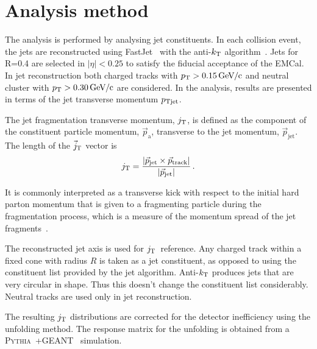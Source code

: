 \section{Analysis method}
\label{sec:methods}

The analysis is performed by analysing jet constituents. In each collision event, the jets are reconstructed using FastJet~\cite{fastjet} with the anti-$k_{\rm T}$ algorithm~\cite{antikt}. Jets for R=0.4 are selected in $\left| \eta \right| < 0.25 $ to satisfy the fiducial acceptance of the EMCal. In jet reconstruction both charged tracks with $\pt{}>\unit[0.15]{\GeVc}$ and neutral cluster with $\pt{}>\unit[0.30]{\GeVc}$ are considered. In the analysis, results are presented in terms of the jet transverse momentum $p_{\rm Tjet}$.

The jet fragmentation transverse momentum, $j_{\rm T}$, is defined as the component of the constituent particle momentum, $\vec{p}_{\mathrm{a}}$, transverse to the jet momentum, $\vec{p}_{\mathrm{jet}}$. 
The length of the $\vec{j}_{\rm T}$ vector is
  \begin{equation}
    j_{\rm T} = \frac{|\vec{p}_{\mathrm{jet}} \times \vec{p}_{\mathrm{track}}|}{|\vec{p}_{\mathrm{jet}}|} \,.
  \label{eq:jtdefinition}
  \end{equation}

It is commonly interpreted as a transverse kick with respect to the initial hard parton momentum that is given to a fragmenting particle during the fragmentation process, which is a measure of the momentum spread of the jet fragments~\cite{}. 

The reconstructed jet axis is used for $j_{\rm T}$ reference. Any charged track within a fixed cone with radius $R$ is taken as a jet constituent, as opposed to using the constituent list provided by the jet algorithm. Anti-$k_{\rm T}$ produces jets that are very circular in shape. Thus this doesn't change the constituent list considerably. Neutral tracks are used only in jet reconstruction.
 
The resulting $j_{\rm T}$ distributions are corrected for the detector inefficiency using the unfolding method. The response matrix for the unfolding is obtained from a \textsc{Pythia}~\cite{introPythia81}+GEANT~\cite{Geant2003,Geant2016} simulation.
 
 
